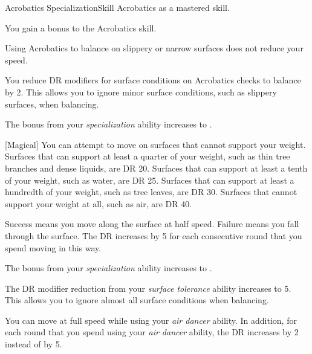     \begin{feat}{Acrobatics Specialization}{Skill}
        \featpre Acrobatics as a mastered skill.

         You gain a  bonus to the Acrobatics skill.

         Using Acrobatics to balance on slippery or narrow surfaces does not reduce your speed.

         You reduce DR modifiers for surface conditions on Acrobatics checks to balance by 2.
        This allows you to ignore minor surface conditions, such as slippery surfaces, when balancing.

         The bonus from your \textit{specialization} ability increases to .

        [Magical] You can attempt to move on surfaces that cannot support your weight.
        Surfaces that can support at least a quarter of your weight, such as thin tree branches and dense liquids, are DR 20.
        Surfaces that can support at least a tenth of your weight, such as water, are DR 25.
        Surfaces that can support at least a hundredth of your weight, such as tree leaves, are DR 30.
        Surfaces that cannot support your weight at all, such as air, are DR 40.

        Success means you move along the surface at half speed.
        Failure means you fall through the surface.
        The DR increases by 5 for each consecutive round that you spend moving in this way.

         The bonus from your \textit{specialization} ability increases to .

         The DR modifier reduction from your \textit{surface tolerance} ability increases to 5.
        This allows you to ignore almost all surface conditions when balancing.

         You can move at full speed while using your \textit{air dancer} ability.
        In addition, for each round that you spend using your \textit{air dancer} ability, the DR increases by 2 instead of by 5.
    \end{feat}

